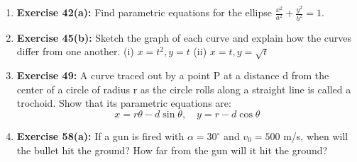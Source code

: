 \documentclass[12pt, a4paper]{article}
\begin{document}
\begin{enumerate}
    \item \textbf{Exercise 42(a):} Find parametric equations for the ellipse $\frac{x^2}{a^2} + \frac{y^2}{b^2} = 1$.

    \item \textbf{Exercise 45(b):} Sketch the graph of each curve and explain how the curves differ from one another.
    (i) $x=t^2, y=t$ \quad (ii) $x=t, y=\sqrt{t}$

    \item \textbf{Exercise 49:} A curve traced out by a point P at a distance d from the center of a circle of radius r as the circle rolls along a straight line is called a trochoid. Show that its parametric equations are:
    \[ x = r\theta - d\sin\theta, \quad y = r - d\cos\theta \]
    
    \item \textbf{Exercise 58(a):} If a gun is fired with $\alpha=30^{\circ}$ and $v_0 = 500$ m/s, when will the bullet hit the ground? How far from the gun will it hit the ground?
\end{enumerate}

\hrulefill
\vspace{1em}
\end{document}

